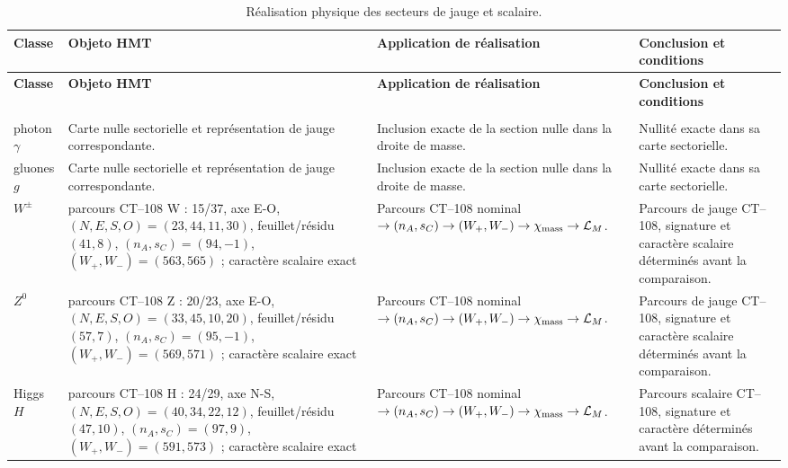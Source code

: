 \begingroup
\setlength{\tabcolsep}{4.5pt}
\renewcommand{\arraystretch}{1.28}
\begin{longtable}{@{}>{\raggedright\arraybackslash}p{}>{\raggedright\arraybackslash}p{}>{\raggedright\arraybackslash}p{}>{\raggedright\arraybackslash}p{}@{}}
\caption{Réalisation physique des secteurs de jauge et scalaire.}\label{tab:masas-realizacion-gauge-escalar}\\
\toprule
\textbf{Classe} & \textbf{Objeto HMT} & \textbf{Application de réalisation} & \textbf{Conclusion et conditions} \\
\midrule
\endfirsthead
\toprule
\textbf{Classe} & \textbf{Objeto HMT} & \textbf{Application de réalisation} & \textbf{Conclusion et conditions} \\
\midrule
\endhead
\midrule
\multicolumn{4}{r}{\footnotesize Suite à la page suivante.}\\
\endfoot
\bottomrule
\endlastfoot
photon $\gamma$ & Carte nulle sectorielle et représentation de jauge correspondante. & Inclusion exacte de la section nulle dans la droite de masse. & Nullité exacte dans sa carte sectorielle. \\
gluones $g$ & Carte nulle sectorielle et représentation de jauge correspondante. & Inclusion exacte de la section nulle dans la droite de masse. & Nullité exacte dans sa carte sectorielle. \\
$W^\pm$ & parcours CT--108 W : 15/37, axe E-O, $(N,E,S,O)=(23,44,11,30)$, feuillet/résidu $(41,8)$, $(n_A,s_C)=(94,-1)$, $(W_+,W_-)=(563,565)$ ; caractère scalaire exact & Parcours CT--108 nominal $\to(n_A,s_C)\to(W_+,W_-)\to\chi_{\rm mass}\to\mathcal L_M$. & Parcours de jauge CT--108, signature et caractère scalaire déterminés avant la comparaison. \\
$Z^0$ & parcours CT--108 Z : 20/23, axe E-O, $(N,E,S,O)=(33,45,10,20)$, feuillet/résidu $(57,7)$, $(n_A,s_C)=(95,-1)$, $(W_+,W_-)=(569,571)$ ; caractère scalaire exact & Parcours CT--108 nominal $\to(n_A,s_C)\to(W_+,W_-)\to\chi_{\rm mass}\to\mathcal L_M$. & Parcours de jauge CT--108, signature et caractère scalaire déterminés avant la comparaison. \\
Higgs $H$ & parcours CT--108 H : 24/29, axe N-S, $(N,E,S,O)=(40,34,22,12)$, feuillet/résidu $(47,10)$, $(n_A,s_C)=(97,9)$, $(W_+,W_-)=(591,573)$ ; caractère scalaire exact & Parcours CT--108 nominal $\to(n_A,s_C)\to(W_+,W_-)\to\chi_{\rm mass}\to\mathcal L_M$. & Parcours scalaire CT--108, signature et caractère déterminés avant la comparaison. \\
\end{longtable}
\endgroup
